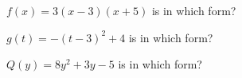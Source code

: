 \documentclass{ximera}
\author{Lee Wayand}
\begin{document}
\begin{exercise} $f(x) = 3(x-3)(x+5)$ is in which form?

\begin{multipleChoice}
\end{multipleChoice}

\end{exercise}










\begin{exercise} $g(t) = -(t-3)^2 + 4$ is in which form?

\begin{multipleChoice}
\end{multipleChoice}

\end{exercise}










\begin{exercise} $Q(y) = 8y^2 + 3y - 5$ is in which form?

\begin{multipleChoice}
\end{multipleChoice}

\end{exercise}
\end{document}
